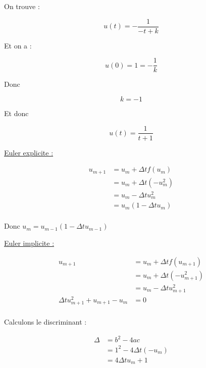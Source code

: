 \documentclass[12pt, letterpaper]{article}
\begin{document}
\begin{enumerate}
  On trouve :

  \begin{equation*}
    u(t) = - \frac{1}{- t + k}
  \end{equation*}

  Et on a :

  \begin{equation*}
    u(0) = 1 = - \frac{1}{k}
  \end{equation*}

  Donc 

  \begin{equation*}
    k = - 1
  \end{equation*}

  Et donc

  \begin{equation*}
    u(t) = \frac{1}{t + 1}
  \end{equation*}


  \underline{Euler explicite :}

  \begin{equation*}
    \begin{split}
      u_{m+1} & = u_m + \Delta t f(u_m) \\
      & = u_m + \Delta t ( - u_m^2) \\
      & = u_m - \Delta t u_m^2 \\
      & = u_m (1 - \Delta t u_m) \\
    \end{split}
  \end{equation*}

  Donc $u_m = u_{m-1} (1 - \Delta t u_{m-1})$

  \underline{Euler implicite :}

  \begin{equation*}
    \begin{split}
      u_{m+1} & = u_m + \Delta t f(u_{m+1}) \\
      & = u_m + \Delta t ( - u_{m+1}^2) \\
      & = u_m - \Delta t u_{m+1}^2 \\
      \Delta t u_{m+1}^2 + u_{m+1} - u_m & = 0\\
    \end{split}
  \end{equation*}

  Calculons le discriminant :

  \begin{equation*}
    \begin{split}
      \Delta & = b^2 - 4ac \\
      & = 1^2 - 4 \Delta t (- u_m) \\
      & = 4 \Delta t u_m + 1\\
    \end{split}
  \end{equation*}


\end{enumerate}
\end{document}
